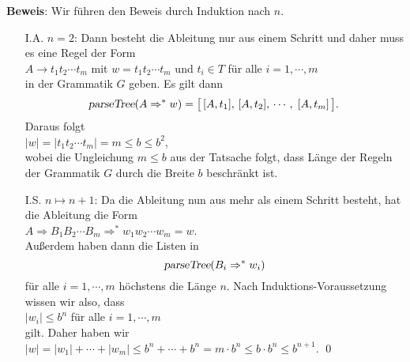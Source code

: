 \noindent
\textbf{Beweis}: Wir f\"uhren den Beweis durch Induktion nach  $n$.
\begin{enumerate}
\item[I.A.] $n=2$:  Dann besteht die Ableitung nur aus einem Schritt und daher muss es eine Regel der Form
            \\
            \hspace*{1.3cm}
            $A \rightarrow t_1t_2 \cdots t_m$ \quad mit $w = t_1t_2 \cdots t_m$ und $t_i \in T$
            f\"ur alle $i=1,\cdots,m$
            \\[0.2cm]
            in der Grammatik $G$ geben.  Es gilt dann
            \[ \textsl{parseTree}(A \Rightarrow^* w) = 
               \bigl[\, [A,t_1],\, [A,t_2],\, \cdots,\; [A,t_m]\, \bigr].\, 
            \]
            Daraus folgt
            \\[0.2cm]
            \hspace*{1.3cm}
            $|w| = |t_1t_2 \cdots t_m| = m \leq b \leq b^{2}$,
            \\[0.2cm]
            wobei die Ungleichung $m \leq b$ aus der Tatsache folgt, dass L\"ange der Regeln der Grammatik
            $G$ durch die Breite $b$ beschr\"ankt ist.
\item[I.S.] $n \mapsto n+1$: Da die Ableitung nun aus mehr als einem Schritt besteht, hat die Ableitung die Form
            \\[0.2cm]
            \hspace*{1.3cm}
            $A \Rightarrow B_1 B_2 \cdots B_m \Rightarrow^* w_1 w_2 \cdots w_m = w$.
            \\[0.2cm]
            Au{\ss}erdem haben dann die Listen in
            \[ \textsl{parseTree}(B_i \Rightarrow^* w_i) 
            \]
            f\"ur alle $i=1,\cdots,m$ h\"ochstens die L\"ange $n$.
            Nach Induktions-Voraussetzung wissen wir also, dass
            \\[0.2cm]
            \hspace*{1.3cm}
            $|w_i| \leq b^{n}$ \quad f\"ur alle $i=1,\cdots,m$
            \\[0.2cm]
            gilt.  Daher haben wir
            \\[0.2cm]
            \hspace*{1.3cm}
            $|w| = |w_1| + \cdots + |w_m| \leq b^{n} + \cdots + b^{n} = 
             m \cdot b^n \leq b \cdot b^n \leq b^{n+1}$. \qed
\end{enumerate}

